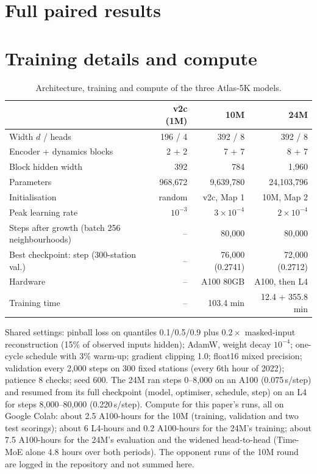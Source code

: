 \documentclass{article}
\begin{document}
\section{Full paired results}
\label{app:paired}







\section{Training details and compute}
\label{app:train}

\begin{table}[H]
\caption{Architecture, training and compute of the three Atlas-5K models.}
\label{tab:train}
\centering\small
\begin{tabular}{lrrr}
\toprule
 & v2c (1M) & 10M & 24M\\
\midrule
Width $d$ / heads & 196 / 4 & 392 / 8 & 392 / 8\\
Encoder + dynamics blocks & 2 + 2 & 7 + 7 & 8 + 7\\
Block hidden width & 392 & 784 & 1,960\\
Parameters & 968,672 & 9,639,780 & 24,103,796\\
Initialisation & random & v2c, Map 1 & 10M, Map 2\\
Peak learning rate & $10^{-3}$ & $3\times10^{-4}$ & $2\times10^{-4}$\\
Steps after growth (batch 256 neighbourhoods) & -- & 80,000 & 80,000\\
Best checkpoint: step (300-station val.) & -- & 76,000 (0.2741) & 72,000 (0.2712)\\
Hardware & -- & A100 80GB & A100, then L4\\
Training time & -- & 103.4 min & 12.4 + 355.8 min\\
\bottomrule
\end{tabular}
\end{table}

Shared settings: pinball loss on quantiles 0.1/0.5/0.9 plus $0.2\times$ masked-input reconstruction (15\% of
observed inputs hidden); AdamW, weight decay $10^{-4}$; one-cycle schedule with 3\% warm-up; gradient clipping 1.0;
float16 mixed precision; validation every 2,000 steps on 300 fixed stations (every 6th hour of 2022); patience 8
checks; seed 600. The 24M ran steps 0--8,000 on an A100 (0.075\,s/step) and resumed from its full checkpoint (model,
optimiser, schedule, step) on an L4 for steps 8,000--80,000 (0.220\,s/step). Compute for this paper's runs, all on Google
Colab: about 2.5 A100-hours for the 10M (training, validation and two test scorings); about 6 L4-hours and 0.2
A100-hours for the 24M's training; about 7.5 A100-hours for the 24M's evaluation and the widened head-to-head (Time-MoE
alone 4.8 hours over both periods). The opponent runs of the 10M round are logged in the repository and not summed here.
\end{document}
